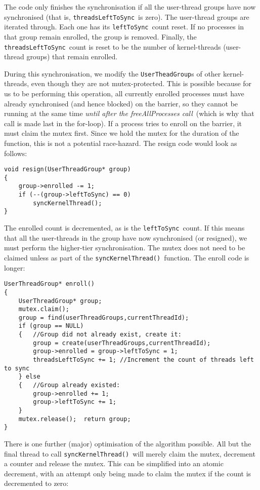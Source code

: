 \documentclass[12pt]{IOS-Book-Article-CPA-2007}
\newcommand{\code}[1]{{\small\texttt{#1}}}
\begin{document}
The code only finishes the synchronisation if all the user-thread groups have now synchronised (that is, \code{threadsLeftToSync}~is zero).  The user-thread
groups are iterated through.  Each one has its \code{leftToSync}~count reset.  If no processes in that group remain enrolled, the group is removed.
Finally, the \code{threadsLeftToSync}~count is reset to be the number of kernel-threads (user-thread groups) that remain enrolled.

During this synchronisation, we modify the \code{UserTheadGroup}s of other kernel-threads, even though they are not mutex-protected.  This is possible
because for us to be performing this operation, all currently enrolled processes must have already synchronised (and hence blocked) on the barrier, so
they cannot be running at the same time \textit{until after the freeAllProcesses call}~(which is why that call is made last in the for-loop).  If a 
process
tries to enroll on the barrier, it must claim the mutex first. Since we hold the mutex for the duration of the function, this is not a potential race-hazard.
The resign code would look as follows:

{\small\begin{verbatim}
void resign(UserThreadGroup* group)
{
    group->enrolled -= 1;
    if (--(group->leftToSync) == 0)    
        syncKernelThread();    
}
\end{verbatim}}

The enrolled count is decremented, as is the \code{leftToSync}~count.  If this means that all the user-threads in the group have now synchronised (or resigned),
we must perform the higher-tier synchronisation.  The mutex does not need to be claimed unless as part of the \code{syncKernelThread()}~function.  The enroll code is longer:

{\small\begin{verbatim}
UserThreadGroup* enroll()
{
    UserThreadGroup* group;
    mutex.claim();
    group = find(userThreadGroups,currentThreadId);
    if (group == NULL)
    {   //Group did not already exist, create it:
        group = create(userThreadGroups,currentThreadId);
        group->enrolled = group->leftToSync = 1;       
        threadsLeftToSync += 1; //Increment the count of threads left to sync
    } else
    {   //Group already existed:
        group->enrolled += 1;
        group->leftToSync += 1;
    }
    mutex.release();  return group;
}
\end{verbatim}}

There is one further (major) optimisation of the algorithm possible.  All but the final thread to call \code{syncKernelThread()}~will merely claim the mutex, decrement a counter and 
release the mutex.  This can be simplified into an atomic decrement, with an attempt only being made to claim the mutex if the count is decremented to zero:
\end{document}
